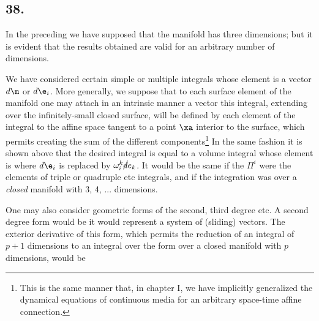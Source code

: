 \subsection*{38.}

In the preceding we have supposed that the manifold has three dimensions; but it is evident that the results obtained are valid for an arbitrary number of dimensions.

We have considered certain simple or multiple integrals whose element is a vector $d\m$ or $d\e_i$. More generally, we suppose that to each surface element of the manifold one may attach in an intrinsic manner a vector
this integral, extending over the infinitely-small closed surface, will be defined by  each element of the integral to the affine space tangent to a point $\xa$ interior to the surface, which permits creating the sum of the different components\footnote{This is the same manner that, in chapter I, we have implicitly generalized the dynamical equations of continuous media for an arbitrary space-time affine connection.} In the same fashion it is shown above that the desired integral is equal to a volume integral whose element is
where $d\e_i$ is replaced by $\omega_i^k \cancel{d}e_k$. It would be the same if the $\Pi^i$ were the elements of triple or quadruple etc integrals, and if the integration was over a \textit{closed} manifold with 3, 4, ... dimensions.

One may also consider geometric forms of the second, third degree etc. A second degree form would be
it would represent a system of (sliding) vectors. The exterior derivative of this form, which permits the reduction of an integral of $p+1$ dimensions to an integral over the form over a closed manifold with $p$ dimensions, would be
